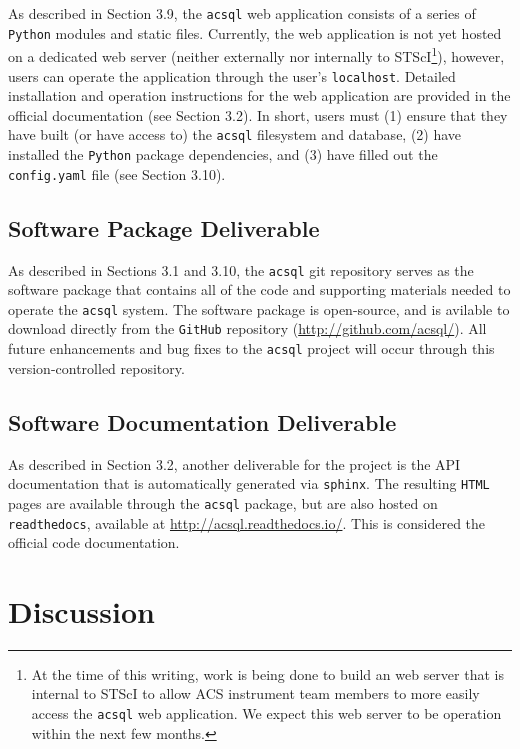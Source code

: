 \documentclass[10pt,journal,compsoc]{IEEEtran}
\begin{document}
As described in Section 3.9, the \texttt{acsql} web application consists of a series of \texttt{Python} modules
and static files.  Currently, the web application is not yet hosted on a dedicated web server (neither externally nor
internally to STScI\footnote{At the time of this writing, work is being done to build an web server that
is internal to STScI to allow ACS instrument team members to more easily access the \texttt{acsql} web
application.  We expect this web server to be operation within the next few months.}), however, users can
operate the application through the user's \texttt{localhost}.  Detailed installation and operation
instructions for the web application are provided in the official documentation (see Section 3.2).  In short,
users must (1) ensure that they have built (or have access to) the \texttt{acsql} filesystem and database,
(2) have installed the \texttt{Python} package dependencies, and (3) have filled out the \texttt{config.yaml}
file (see Section 3.10).

\subsection{Software Package Deliverable}

As described in Sections 3.1 and 3.10, the \texttt{acsql} git repository serves as the software package that contains
all of the code and supporting materials needed to operate the \texttt{acsql} system.  The software package is open-source,
and is avilable to download directly from the \texttt{GitHub} repository (\url{http://github.com/acsql/}).  All
future enhancements and bug fixes to the \texttt{acsql} project will occur through this version-controlled repository.

\subsection{Software Documentation Deliverable}

As described in Section 3.2, another deliverable for the project is the API documentation that is automatically
generated via \texttt{sphinx}.  The resulting \texttt{HTML} pages are available through the \texttt{acsql} package,
but are also hosted on \texttt{readthedocs}, available at \url{http://acsql.readthedocs.io/}.  This is considered
the official code documentation.

\section{Discussion}\label{sec:discussion}
\end{document}
